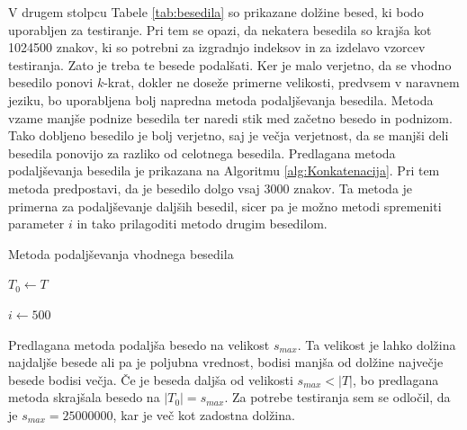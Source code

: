 V drugem stolpcu Tabele \ref{tab:besedila} so prikazane dolžine besed, ki bodo uporabljen za testiranje. Pri tem se opazi, da nekatera besedila so krajša kot 1024500 znakov, ki so potrebni za izgradnjo indeksov in za izdelavo vzorcev testiranja. Zato je treba te besede podalšati. Ker je malo verjetno, da se vhodno besedilo ponovi $k$-krat, dokler ne doseže primerne velikosti, predvsem v naravnem jeziku, bo uporabljena bolj napredna metoda podaljševanja besedila. Metoda vzame manjše podnize besedila ter naredi stik med začetno besedo in podnizom. Tako dobljeno besedilo je bolj verjetno, saj je večja verjetnost, da se manjši deli besedila ponovijo za razliko od celotnega besedila. Predlagana metoda podaljševanja besedila je prikazana na Algoritmu \ref{alg:Konkatenacija}. Pri tem metoda predpostavi, da je besedilo dolgo vsaj $3000$ znakov. Ta metoda je primerna za podaljševanje daljših besedil, sicer pa je možno metodi spremeniti parameter $i$ in tako prilagoditi metodo drugim besedilom.


\begin{algorithm}[htb]

\caption{Metoda podaljševanja vhodnega besedila}\label{alg:Konkatenacija}
{
    {$T_0\leftarrow T$}

    {$i\leftarrow 500$}
    
    
}
\end{algorithm}

Predlagana metoda podaljša besedo na velikost $s_{max}$. Ta velikost je lahko dolžina najdaljše besede ali pa je poljubna vrednost, bodisi manjša od dolžine največje besede bodisi večja. Če je beseda daljša od velikosti $s_{max}<|T|$, bo predlagana metoda skrajšala besedo na $|T_0|=s_{max}$. Za potrebe testiranja sem se odločil, da je $s_{max}=25000000$, kar je več kot zadostna dolžina.

